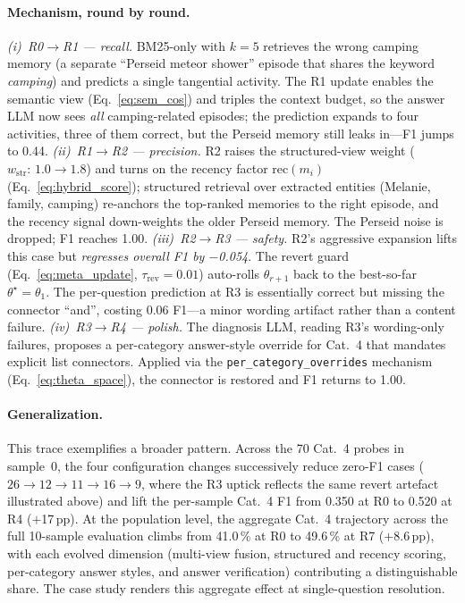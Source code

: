\paragraph{Mechanism, round by round.}
\textit{(i)~R0$\to$R1 — recall.} BM25-only with $k{=}5$ retrieves the wrong camping memory (a separate ``Perseid meteor shower'' episode that shares the keyword \emph{camping}) and predicts a single tangential activity. The R1 update enables the semantic view (Eq.~\ref{eq:sem_cos}) and triples the context budget, so the answer LLM now sees \emph{all} camping-related episodes; the prediction expands to four activities, three of them correct, but the Perseid memory still leaks in—F1 jumps to 0.44.
\textit{(ii)~R1$\to$R2 — precision.} R2 raises the structured-view weight ($w_{\text{str}}{:}\,1.0\to1.8$) and turns on the recency factor $\text{rec}(m_i)$ (Eq.~\ref{eq:hybrid_score}); structured retrieval over extracted entities (Melanie, family, camping) re-anchors the top-ranked memories to the right episode, and the recency signal down-weights the older Perseid memory. The Perseid noise is dropped; F1 reaches 1.00.
\textit{(iii)~R2$\to$R3 — safety.} R2's aggressive expansion lifts this case but \emph{regresses overall F1 by $-$0.054}. The revert guard (Eq.~\ref{eq:meta_update}, $\tau_{\text{rev}}{=}0.01$) auto-rolls $\theta_{r+1}$ back to the best-so-far $\theta^{\star}{=}\theta_1$. The per-question prediction at R3 is essentially correct but missing the connector ``and'', costing 0.06 F1—a minor wording artifact rather than a content failure.
\textit{(iv)~R3$\to$R4 — polish.} The diagnosis LLM, reading R3's wording-only failures, proposes a per-category answer-style override for Cat.~4 that mandates explicit list connectors. Applied via the \texttt{per\_category\_overrides} mechanism (Eq.~\ref{eq:theta_space}), the connector is restored and F1 returns to 1.00.

\paragraph{Generalization.} This trace exemplifies a broader pattern. Across the 70 Cat.~4 probes in sample~0, the four configuration changes successively reduce zero-F1 cases ($26\to12\to11\to16\to9$, where the R3 uptick reflects the same revert artefact illustrated above) and lift the per-sample Cat.~4 F1 from 0.350 at R0 to 0.520 at R4 ($+$17\,pp). At the population level, the aggregate Cat.~4 trajectory across the full 10-sample evaluation climbs from 41.0\,\% at R0 to 49.6\,\% at R7 ($+$8.6\,pp), with each evolved dimension (multi-view fusion, structured and recency scoring, per-category answer styles, and answer verification) contributing a distinguishable share. The case study renders this aggregate effect at single-question resolution.

